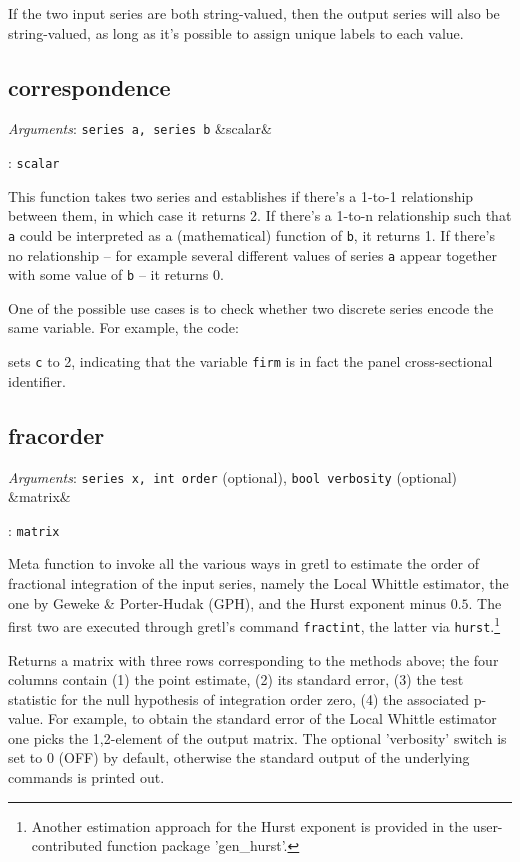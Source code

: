 \documentclass[11pt,english]{article}
\newcommand{\ArgRet}[2]{%
  {\it Arguments}: {#1}%
  \ifx&#2&%
  \else
  \par\smallskip\noindent {\it Return type}: \texttt{#2}
  \fi%
  \par\medskip\par%
  }
\begin{document}
If the two input series are both string-valued, then the output series
will also be string-valued, as long as it's possible to assign unique
labels to each value.

\subsection{correspondence}

\ArgRet{\texttt{series a, series b}}{scalar}

This function takes two series and establishes if there's a 1-to-1
relationship between them, in which case it returns 2.  If there's a
1-to-n relationship such that \texttt{a} could be interpreted as a
(mathematical) function of \texttt{b}, it returns 1. If there's no relationship
-- for example several different values of series \texttt{a} appear together
with some value of \texttt{b} -- it returns 0.

One of the possible use cases is to check whether two discrete series encode
the same variable. For example, the code:
sets \texttt{c} to 2, indicating that the variable \texttt{firm} is in fact the
panel cross-sectional identifier.

\subsection{fracorder}

\ArgRet{\texttt{series x, int order} (optional), \texttt{bool verbosity}
 (optional)}{matrix}

Meta function to invoke all the various ways in gretl to estimate the order of
fractional integration of the input series, namely the Local Whittle estimator,
the one by Geweke \& Porter-Hudak (GPH), and the Hurst exponent minus $0.5$.
The first two are executed through gretl's command \texttt{fractint}, the
latter via \texttt{hurst}.\footnote{Another estimation approach for the Hurst
exponent is provided in the user-contributed function package 'gen\_hurst'.}

Returns a matrix with three rows corresponding to the methods above; the four
columns contain (1) the point estimate, (2) its standard error, (3) the test
statistic for the null hypothesis of integration order zero, (4) the associated
p-value. For example, to obtain the standard error of the Local Whittle
estimator one picks the 1,2-element of the output matrix. The optional
'verbosity' switch is set to 0 (OFF) by default, otherwise the standard output
of the underlying commands is printed out.
\end{document}
